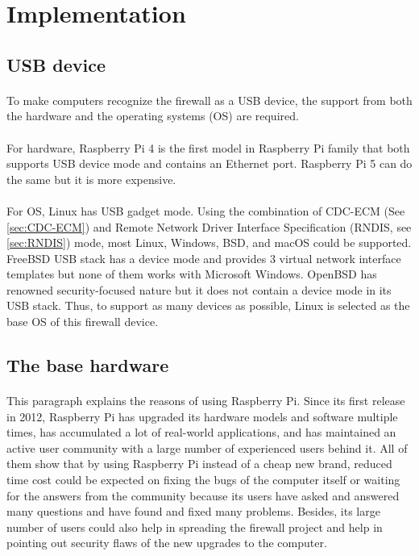 \documentclass[mscthesis]{usiinfthesis}
\begin{document}
\section{Implementation}
\subsection{USB device}
\paragraph{}
To make computers recognize the firewall as a USB device, the support from both the hardware and the operating systems (OS) are required.
\paragraph{}
For hardware, Raspberry Pi 4 is the first model in Raspberry Pi family that both supports USB device mode and contains an Ethernet port. Raspberry Pi 5 can do the same but it is more expensive.
\paragraph{}
For OS, Linux has USB gadget mode. Using the combination of CDC-ECM (See \cref{sec:CDC-ECM}) and Remote Network Driver Interface Specification (RNDIS, see \cref{sec:RNDIS}) mode, most Linux, Windows, BSD, and macOS could be supported. FreeBSD USB stack has a device mode and provides 3 virtual network interface templates but none of them works with Microsoft Windows\citep{freebsdhb:usb}. OpenBSD has renowned security-focused nature but it does not contain a device mode in its USB stack. Thus, to support as many devices as possible, Linux is selected as the base OS of this firewall device.

\subsection{The base hardware}
\paragraph{}
This paragraph explains the reasons of using Raspberry Pi. Since its first release in 2012, Raspberry Pi has upgraded its hardware models and software multiple times, has accumulated a lot of real-world applications, and has maintained an active user community with a large number of experienced users behind it. All of them show that by using Raspberry Pi instead of a cheap new brand, reduced time cost could be expected on fixing the bugs of the computer itself or waiting for the answers from the community because its users have asked and answered many questions and have found and fixed many problems. Besides, its large number of users could also help in spreading the firewall project and help in pointing out security flaws of the new upgrades to the computer.
\end{document}

